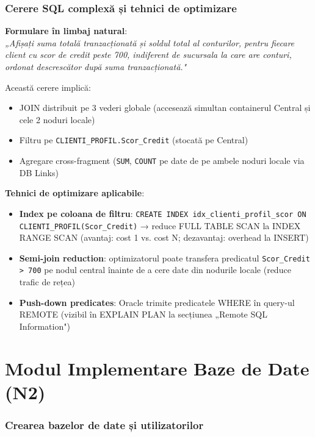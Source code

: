 \documentclass[12pt,a4paper]{article}
\begin{document}
\section{Cerere SQL complexă și tehnici de optimizare}

\textbf{Formulare în limbaj natural}: \\
\textit{„Afișați suma totală tranzacționată și soldul total al conturilor, pentru fiecare client
cu scor de credit peste 700, indiferent de sucursala la care are conturi, ordonat descrescător
după suma tranzacționată."}

Această cerere implică:
\begin{itemize}
  \item JOIN distribuit pe 3 vederi globale (accesează simultan containerul Central și cele 2 noduri locale)
  \item Filtru pe \texttt{CLIENTI\_PROFIL.Scor\_Credit} (stocată pe Central)
  \item Agregare cross-fragment (\texttt{SUM}, \texttt{COUNT} pe date de pe ambele noduri locale via DB Links)
\end{itemize}

\textbf{Tehnici de optimizare aplicabile}:
\begin{itemize}
  \item \textbf{Index pe coloana de filtru}: \texttt{CREATE INDEX idx\_clienti\_profil\_scor ON CLIENTI\_PROFIL(Scor\_Credit)}
    → reduce FULL TABLE SCAN la INDEX RANGE SCAN (avantaj: cost 1 vs. cost N; dezavantaj: overhead la INSERT)
  \item \textbf{Semi-join reduction}: optimizatorul poate transfera predicatul \texttt{Scor\_Credit > 700}
    pe nodul central înainte de a cere date din nodurile locale (reduce trafic de rețea)
  \item \textbf{Push-down predicates}: Oracle trimite predicatele WHERE în query-ul REMOTE
    (vizibil în EXPLAIN PLAN la secțiunea „Remote SQL Information")
\end{itemize}

\part{Modul Implementare Baze de Date (N2)}

\section{Crearea bazelor de date și utilizatorilor}
\end{document}
